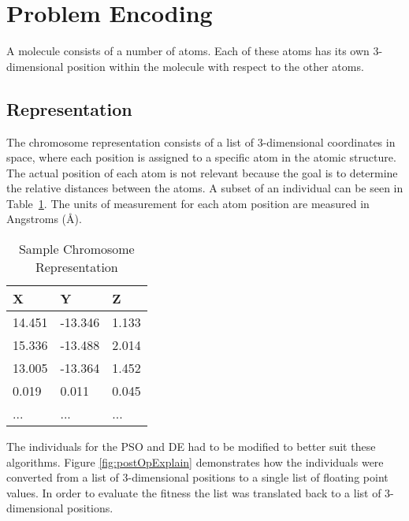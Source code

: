 \section{Problem Encoding}

A molecule consists of a number of atoms. Each of these atoms has its own 3-dimensional position within the molecule with respect to the other atoms.

\subsection{Representation}
The chromosome representation consists of a list of 3-dimensional coordinates in space, where each position is assigned to a specific atom in the atomic structure. The actual position of each atom is not relevant because the goal is to determine the relative distances between the atoms. A subset of an individual can be seen in Table~\ref{table:sampleChromosome}. The units of measurement for each atom position are measured in Angstroms (\AA).

\begin{table}
\caption{Sample Chromosome Representation}
\label{table:sampleChromosome}
\centering
\normalsize
\begin{tabular}{ | l | l | l |}
  \hline
    X & Y & Z \\ \hline
    14.451 & -13.346 & 1.133 \\ \hline
    15.336 & -13.488 & 2.014 \\ \hline
    13.005 & -13.364 & 1.452 \\ \hline
    0.019 & 0.011 & 0.045 \\ \hline
    ... & ... & ... \\ \hline
\end{tabular}
\end{table}

The individuals for the PSO and DE had to be modified to better suit these algorithms. Figure \ref{fig:postOpExplain} demonstrates how the individuals were converted from a list of 3-dimensional positions to a single list of floating point values. In order to evaluate the fitness the list was translated back to a list of 3-dimensional positions.